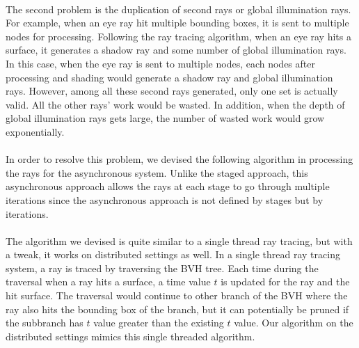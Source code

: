 \documentclass[a4paper, oneside, 10pt]{article}
\begin{document}
\paragraph{} The second problem is the duplication of second rays or global illumination rays. For example, when an eye ray hit multiple bounding boxes, it is sent to multiple nodes for processing. Following the ray tracing algorithm, when an eye ray hits a surface, it generates a shadow ray and some number of global illumination rays. In this case, when the eye ray is sent to multiple nodes, each nodes after processing and shading would generate a shadow ray and global illumination rays. However, among all these second rays generated, only one set is actually valid. All the other rays' work would be wasted. In addition, when the depth of global illumination rays gets large, the number of wasted work would grow exponentially. 
\paragraph{} In order to resolve this problem, we devised the following algorithm in processing the rays for the asynchronous system.  Unlike the staged approach, this asynchronous approach allows the rays at each stage to go through multiple iterations since the asynchronous approach is not defined by stages but by iterations.
\paragraph{} The algorithm we devised is quite similar to a single thread ray tracing, but with a tweak, it works on distributed settings as well.  In a single thread ray tracing system, a ray is traced by traversing the BVH tree. Each time during the traversal when a ray hits a surface, a time value $t$ is updated for the ray and the hit surface.  The traversal would continue to other branch of the BVH where the ray also hits the bounding box of the branch, but it can potentially be pruned if the subbranch has $t$ value greater than the existing $t$ value. Our algorithm on the distributed settings mimics this single threaded algorithm.
\end{document}
